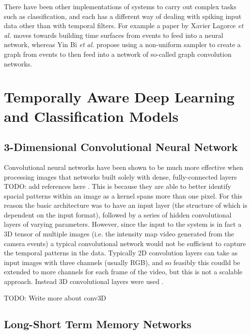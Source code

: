 There have been other implementations of systems to carry out complex tasks such as classification, and each has a different way of dealing with spiking input data other than with temporal filters. For example a paper by Xavier Lagorce \textit{et al.}\cite{eventsToTimeSurfaces} moves towards building time surfaces from events to feed into a neural network, whereas Yin Bi \textit{et al.}\cite{eventsToGraphs} propose using a non-uniform sampler to create a graph from events to then feed into a network of so-called graph convolution networks.

\section{Temporally Aware Deep Learning and Classification Models} \label{sec:temporally_aware_models}

\subsection{3-Dimensional Convolutional Neural Network} \label{ssec:3D_conv_network}

Convolutional neural networks have been shown to be much more effective when processing images that networks built solely with dense, fully-connected layers \color{red} TODO: add references here \color{black}. This is because they are able to better identify spacial patterns within an image as a kernel spans more than one pixel. For this reason the basic architecture was to have an input layer (the structure of which is dependent on the input format), followed by a series of hidden convolutional layers of varying parameters.
However, since the input to the system is in fact a 3D tensor of multiple images (i.e. the intensity map video generated from the camera events) a typical convolutional network would not be sufficient to capture the temporal patterns in the data. Typically 2D convolution layers can take as input images with three channels (usually RGB), and so feasibly this coudld be extended to more channels for each frame of the video, but this is not a scalable approach. Instead 3D convolutional layers were used \cite{3DConv}.

\color{red} TODO: Write more about conv3D \color{black}

\subsection{Long-Short Term Memory Networks}

